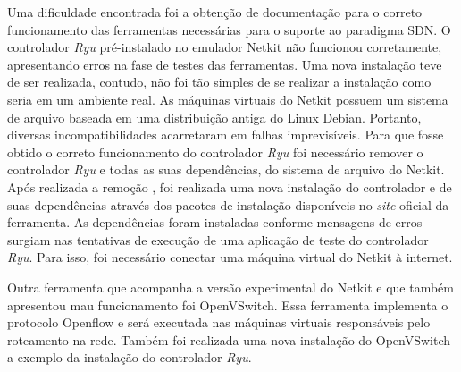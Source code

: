\documentclass[	12pt, Times, openright, twoside, a4paper, english, brazil]{abntex2}
\begin{document}

Uma dificuldade encontrada foi a obtenção de documentação para o correto funcionamento das ferramentas necessárias para o suporte ao paradigma SDN. O controlador \textit{Ryu} pré-instalado no emulador Netkit não funcionou corretamente, apresentando erros na fase de testes das ferramentas. Uma nova instalação teve de ser realizada, contudo, não foi tão simples de se realizar a instalação como seria em um ambiente real. As máquinas virtuais do Netkit possuem um sistema de arquivo baseada em uma distribuição antiga do Linux Debian. Portanto, diversas incompatibilidades acarretaram em falhas imprevisíveis. Para que fosse obtido o correto funcionamento do controlador \textit{Ryu} foi necessário remover o controlador \textit{Ryu} e todas as suas dependências, do sistema de arquivo do Netkit. Após realizada a remoção , foi realizada uma nova instalação do controlador e de suas dependências através dos pacotes de instalação disponíveis no \textit{site} oficial da ferramenta. As dependências foram instaladas conforme mensagens de erros surgiam nas tentativas de execução de uma aplicação de teste do controlador \textit{Ryu}. Para isso, foi necessário conectar uma máquina virtual do Netkit à internet.


Outra ferramenta que acompanha a versão experimental do Netkit e que também apresentou mau funcionamento foi OpenVSwitch. Essa ferramenta implementa o protocolo Openflow e será executada nas máquinas virtuais responsáveis pelo roteamento na rede. Também foi realizada uma nova instalação do OpenVSwitch a exemplo da instalação do controlador \textit{Ryu}.
\end{document}
